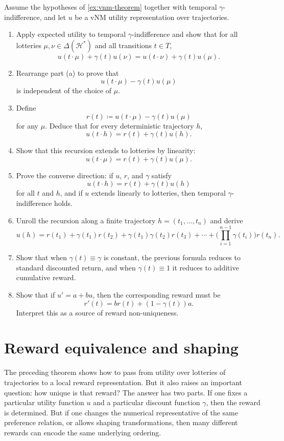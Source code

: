 \documentclass[11pt]{article}
\newcommand{\Hcal}{\mathcal{H}}
\newcommand{\Lot}{\Delta}
\begin{document}
\begin{exercise}
\label{ex:markov-reward}
Assume the hypotheses of \cref{ex:vnm-theorem} together with temporal
$\gamma$-indifference, and let $u$ be a vNM utility representation over
trajectories.
\begin{enumerate}[label=(\alph*)]
\item Apply expected utility to temporal $\gamma$-indifference and show that for
all lotteries $\mu,\nu\in\Lot(\Hcal^*)$ and all transitions $t\in T$,
\[
u(t\cdot \mu)+\gamma(t)u(\nu)=u(t\cdot \nu)+\gamma(t)u(\mu).
\]
\item Rearrange part (a) to prove that
\[
u(t\cdot \mu)-\gamma(t)u(\mu)
\]
is independent of the choice of $\mu$.
\item Define
\[
r(t)\coloneqq u(t\cdot \mu)-\gamma(t)u(\mu)
\]
for any $\mu$. Deduce that for every deterministic trajectory $h$,
\[
u(t\cdot h)=r(t)+\gamma(t)u(h).
\]
\item Show that this recursion extends to lotteries by linearity:
\[
u(t\cdot \mu)=r(t)+\gamma(t)u(\mu).
\]
\item Prove the converse direction: if $u$, $r$, and $\gamma$ satisfy
\[
u(t\cdot h)=r(t)+\gamma(t)u(h)
\]
for all $t$ and $h$, and if $u$ extends linearly to lotteries, then temporal
$\gamma$-indifference holds.
\item Unroll the recursion along a finite trajectory
$h=(t_1,\dots,t_n)$ and derive
\[
u(h)=r(t_1)+\gamma(t_1)r(t_2)+\gamma(t_1)\gamma(t_2)r(t_3)+\cdots+
\Bigg(\prod_{i=1}^{n-1}\gamma(t_i)\Bigg)r(t_n).
\]
\item Show that when $\gamma(t)\equiv \gamma$ is constant, the previous formula
reduces to standard discounted return, and when $\gamma(t)\equiv 1$ it reduces
to additive cumulative reward.
\item Show that if $u' = a+bu$, then the corresponding reward must be
\[
r'(t)=br(t)+(1-\gamma(t))a.
\]
Interpret this as a source of reward non-uniqueness.
\end{enumerate}
\end{exercise}

\section{Reward equivalence and shaping}

The preceding theorem shows how to pass from utility over lotteries of
trajectories to a local reward representation. But it also raises an important
question: how unique is that reward? The answer has two parts. If one fixes a
particular utility function $u$ and a particular discount function $\gamma$,
then the reward is determined. But if one changes the numerical representative
of the same preference relation, or allows shaping transformations, then many
different rewards can encode the same underlying ordering.
\end{document}
